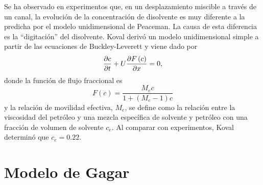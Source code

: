 \documentclass[
  aspectratio=1610,
  c,
  handout,
  9pt,
  spanish
]{beamer}
\begin{document}
\begin{frame}
    \frametitle{\secname}

    Se ha observado en experimentos que, en un desplazamiento
    miscible a través de un canal, la evolución de la concentración
    de disolvente es muy diferente a la predicha por el modelo
    unidimensional de Peaceman.
    La causa de esta diferencia es la ``digitación'' del disolvente.
    Koval derivó un modelo unidimensional simple a partir de las
    ecuaciones de Buckley-Leverett y viene dado por
    \begin{equation}
        \diffp{c}{t}+U\diffp{F\left(c\right)}{x}=0,
    \end{equation}
    donde la función de flujo fraccional es
    \begin{equation*}
        F\left(c\right)=
        \frac{M_{e}c}{1+\left(M_{e}-1\right)c}
    \end{equation*}
    y la relación de movilidad efectiva, $M_{e}$, se define como la
    relación entre la viscosidad del petróleo y una mezcla específica
    de solvente y petróleo con una fracción de volumen de solvente $c_{e}$.
    Al comparar con experimentos, Koval determinó que $c_{e}=0.22$.
\end{frame}

\section{Modelo de Gagar~\cite{Gargar2020}}
\end{document}
